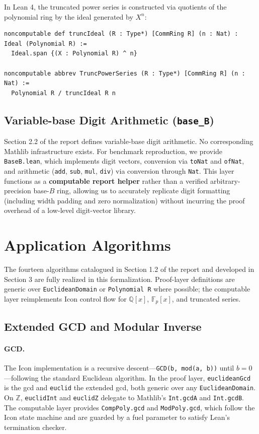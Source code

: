 \documentclass[11pt,a4paper]{article}
\begin{document}
In Lean 4, the truncated power series is constructed via quotients of the polynomial ring by the ideal generated by $X^n$:

\begin{lstlisting}[style=leanbox]
noncomputable def truncIdeal (R : Type*) [CommRing R] (n : Nat) : Ideal (Polynomial R) :=
  Ideal.span {(X : Polynomial R) ^ n}

noncomputable abbrev TruncPowerSeries (R : Type*) [CommRing R] (n : Nat) :=
  Polynomial R / truncIdeal R n
\end{lstlisting}

\subsection{Variable-base Digit Arithmetic (\texttt{base\_B})}
Section 2.2 of the report defines variable-base digit arithmetic. No corresponding Mathlib infrastructure exists. For benchmark reproduction, we provide \texttt{BaseB.lean}, which implements digit vectors, conversion via \texttt{toNat} and \texttt{ofNat}, and arithmetic (\texttt{add}, \texttt{sub}, \texttt{mul}, \texttt{div}) via conversion through \texttt{Nat}. This layer functions as a \textbf{computable report helper} rather than a verified arbitrary-precision base-$B$ ring, allowing us to accurately replicate digit formatting (including width padding and zero normalization) without incurring the proof overhead of a low-level digit-vector library.

\section{Application Algorithms}
The fourteen algorithms catalogued in Section 1.2 of the report and developed in Section 3 are fully realized in this formalization. Proof-layer definitions are generic over \texttt{EuclideanDomain} or \texttt{Polynomial R} where possible; the computable layer reimplements Icon control flow for $\mathbb{Q}[x]$, $\mathbb{F}_p[x]$, and truncated series.

\subsection{Extended GCD and Modular Inverse}
\paragraph{GCD.} The Icon implementation is a recursive descent---\texttt{GCD(b, mod(a, b))} until $b = 0$---following the standard Euclidean algorithm. In the proof layer, \texttt{euclideanGcd} is the gcd and \texttt{euclid} the extended gcd, both generic over any \texttt{EuclideanDomain}. On $\mathbb{Z}$, \texttt{euclidInt} and \texttt{euclidZ} delegate to Mathlib's \texttt{Int.gcdA} and \texttt{Int.gcdB}. The computable layer provides \texttt{CompPoly.gcd} and \texttt{ModPoly.gcd}, which follow the Icon state machine and are guarded by a fuel parameter to satisfy Lean's termination checker.
\end{document}
